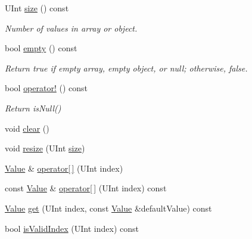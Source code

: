\begin{DoxyCompactItemize}
\item 
\hypertarget{class_json_1_1_value_a084e52ae96038a05bcae177b345adc78}{U\+Int \hyperlink{class_json_1_1_value_a084e52ae96038a05bcae177b345adc78}{size} () const }\label{class_json_1_1_value_a084e52ae96038a05bcae177b345adc78}

\begin{DoxyCompactList}\small\item\em Number of values in array or object. \end{DoxyCompactList}\item 
\hypertarget{class_json_1_1_value_a5417a775ce08947b88d3ea51ffdfbeab}{bool \hyperlink{class_json_1_1_value_a5417a775ce08947b88d3ea51ffdfbeab}{empty} () const }\label{class_json_1_1_value_a5417a775ce08947b88d3ea51ffdfbeab}

\begin{DoxyCompactList}\small\item\em Return true if empty array, empty object, or null; otherwise, false. \end{DoxyCompactList}\item 
\hypertarget{class_json_1_1_value_abc13d1c2c01f19dc1f4b68046b91ff94}{bool \hyperlink{class_json_1_1_value_abc13d1c2c01f19dc1f4b68046b91ff94}{operator!} () const }\label{class_json_1_1_value_abc13d1c2c01f19dc1f4b68046b91ff94}

\begin{DoxyCompactList}\small\item\em Return is\+Null() \end{DoxyCompactList}\item 
void \hyperlink{class_json_1_1_value_a81f80769328f0de4955e797282c0c0b6}{clear} ()
\item 
void \hyperlink{class_json_1_1_value_a7fa89502822552dca2b130d06e0a587f}{resize} (U\+Int \hyperlink{class_json_1_1_value_a084e52ae96038a05bcae177b345adc78}{size})
\item 
\hyperlink{class_json_1_1_value}{Value} \& \hyperlink{class_json_1_1_value_a14e6e2d41127fc77182b974a23c3d001}{operator\mbox{[}$\,$\mbox{]}} (U\+Int index)
\item 
const \hyperlink{class_json_1_1_value}{Value} \& \hyperlink{class_json_1_1_value_aa92134eb4b2623538e04e18a57f134c3}{operator\mbox{[}$\,$\mbox{]}} (U\+Int index) const 
\item 
\hyperlink{class_json_1_1_value}{Value} \hyperlink{class_json_1_1_value_ac29557d93e40261a1b22b119b99dbd53}{get} (U\+Int index, const \hyperlink{class_json_1_1_value}{Value} \&default\+Value) const 
\item 
\hypertarget{class_json_1_1_value_adf93edcf7eab50ca1c6e7fa455f7ad43}{bool \hyperlink{class_json_1_1_value_adf93edcf7eab50ca1c6e7fa455f7ad43}{is\+Valid\+Index} (U\+Int index) const }\label{class_json_1_1_value_adf93edcf7eab50ca1c6e7fa455f7ad43}


\end{DoxyCompactItemize}
